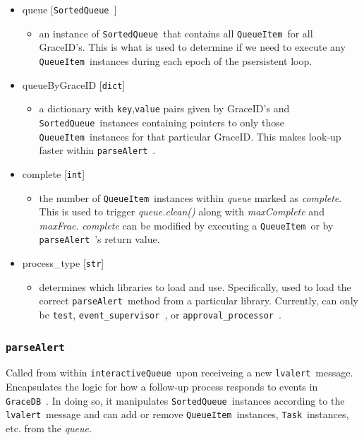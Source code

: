 \documentclass{article}
\newcommand{\GraceDB}{\texttt{GraceDB}~}
\newcommand{\alert}{\texttt{lvalert}~}
\newcommand{\interactiveQueue}{\texttt{interactiveQueue}~}
\newcommand{\parseAlert}{\texttt{parseAlert}~}
\newcommand{\SortedQueue}{\texttt{SortedQueue}~}
\newcommand{\QueueItem}{\texttt{QueueItem}~}
\newcommand{\Task}{\texttt{Task}~}
\newcommand{\approvalProcessor}{\texttt{approval\_processor}~}
\newcommand{\eventSupervisor}{\texttt{event\_supervisor}~}
\begin{document}
\begin{itemize}
    \item{queue [\SortedQueue]
        \begin{itemize}
            \item{an instance of \SortedQueue that contains all \QueueItem for all GraceID's. This is what is used to determine if we need to execute any \QueueItem instances during each epoch of the psersistent loop.}
        \end{itemize}
         }
    \item{queueByGraceID [\texttt{dict}]
        \begin{itemize}
            \item{a dictionary with \texttt{key},\texttt{value} pairs given by GraceID's and \SortedQueue instances containing pointers to only those \QueueItem instances for that particular GraceID. This makes look-up faster within \parseAlert.}
        \end{itemize}
         }
    \item{complete [\texttt{int}]
        \begin{itemize}
            \item{the number of \QueueItem instances within \textit{queue} marked as \textit{complete}. This is used to trigger \textit{queue.clean()} along with \textit{maxComplete} and \textit{maxFrac}. \textit{complete} can be modified by executing a \QueueItem or by \parseAlert's return value.}
        \end{itemize}
         }
    \item{process\_type [\texttt{str}]
        \begin{itemize}
            \item{determines which libraries to load and use. Specifically, used to load the correct \parseAlert method from a particular library. Currently, can only be \texttt{test}, \eventSupervisor, or \approvalProcessor.}
        \end{itemize}
         }
\end{itemize}


\subsubsection{\parseAlert}
\label{sec: parseAlert}

Called from within \interactiveQueue upon receiveing a new \alert message.
Encapsulates the logic for how a follow-up process responds to events in \GraceDB.
In doing so, it manipulates \SortedQueue instances according to the \alert message and can add or remove \QueueItem instances, \Task instances, etc. from the \textit{queue}.
\end{document}
